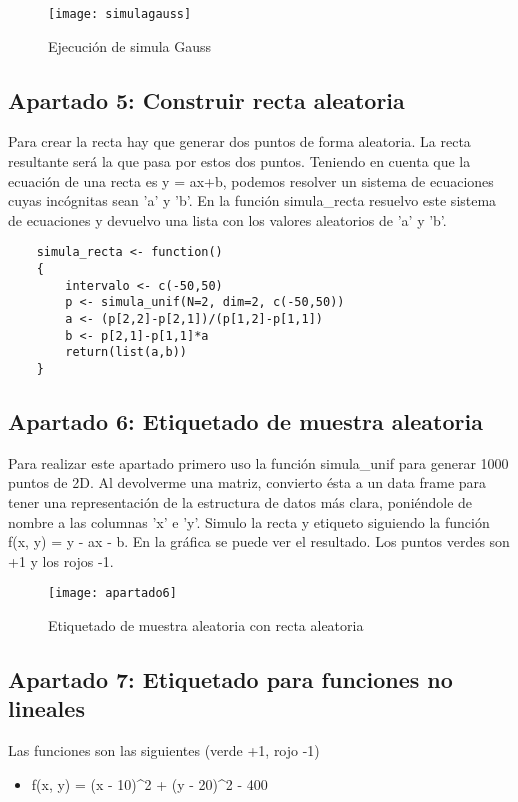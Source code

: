 	\begin{figure} [H]
	\centering
	\texttt{[image: simulagauss]}
	\caption{Ejecución de simula Gauss}
	\label{fig:simulagauss}
	\end{figure}
	
	
	\subsection{Apartado 5: Construir recta aleatoria}
	Para crear la recta hay que generar dos puntos de forma aleatoria. La recta resultante será la que pasa por estos dos puntos. Teniendo en cuenta que la ecuación de una recta es y = ax+b, podemos resolver un sistema de ecuaciones cuyas incógnitas sean 'a' y 'b'. En la función simula\_recta resuelvo este sistema de ecuaciones y devuelvo una lista con los valores aleatorios de 'a' y 'b'.
	\\
	
	\begin{lstlisting}
	simula_recta <- function()
	{
		intervalo <- c(-50,50)
		p <- simula_unif(N=2, dim=2, c(-50,50))
		a <- (p[2,2]-p[2,1])/(p[1,2]-p[1,1])
		b <- p[2,1]-p[1,1]*a
		return(list(a,b))
	}
	\end{lstlisting}
	
	\subsection{Apartado 6: Etiquetado de muestra aleatoria}
	Para realizar este apartado primero uso la función simula\_unif para generar 1000 puntos de 2D. Al devolverme una matriz, convierto ésta a un data frame para tener una representación de la estructura de datos más clara, poniéndole de nombre a las columnas 'x' e 'y'. Simulo la recta y etiqueto siguiendo la función f(x, y) = y - ax - b. En la gráfica se puede ver el resultado. Los puntos verdes son +1 y los rojos -1.
	\begin{figure}[H]
	\centering
	\texttt{[image: apartado6]}
	\caption{Etiquetado de muestra aleatoria con recta aleatoria}
	\label{fig:apartado6}
	\end{figure}
	
	\subsection{Apartado 7: Etiquetado para funciones no lineales}
	Las funciones son las siguientes (verde +1, rojo -1)
	\begin{itemize}
	\item f(x, y) = (x - 10)^2 + (y - 20)^2 - 400
	\end{itemize}
	
